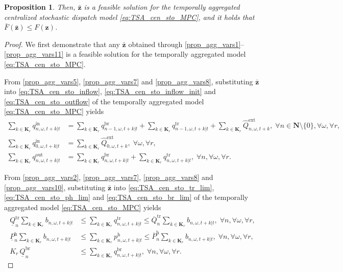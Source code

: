 \documentclass[10pt,a4paper]{amsart}
\newtheorem{proposition}{Proposition}
\begin{document}
\begin{proposition}
Then, $\boldsymbol{\bar{z}}$ is a feasible solution for the temporally aggregated centralized stochastic dispatch model
\eqref{eq:TSA_cen_sto_MPC}, and it holds that $\bar{F}\left(\boldsymbol{\bar{z}}\right) \leq F\left(\boldsymbol{z}\right)$.
\end{proposition}

\begin{proof}
We first demonstrate that any $\boldsymbol{\bar{z}}$ obtained through \eqref{prop_agg_vars1}--\eqref{prop_agg_vars11} is a feasible solution for the temporally aggregated model \eqref{eq:TSA_cen_sto_MPC}.

From \eqref{prop_agg_vars5}, \eqref{prop_agg_vars7} and \eqref{prop_agg_vars8},
substituting $\boldsymbol{\bar{z}}$ into
\eqref{eq:TSA_cen_sto_inflow}, \eqref{eq:TSA_cen_sto_inflow_init} and \eqref{eq:TSA_cen_sto_outflow}
of the temporally aggregated model \eqref{eq:TSA_cen_sto_MPC} yields
\begin{align}
\sum_{k \in \boldsymbol{K}_r} q^{\mathrm{in}}_{n,\omega,t+k|t} & =
\sum_{k \in \boldsymbol{K}_r} q^{\mathrm{br}}_{n-1,\omega,t+k|t}
+
\sum_{k \in \boldsymbol{K}_r} q^{\mathrm{tr}}_{n-1,\omega,t+k|t}
+ \sum_{k \in \boldsymbol{K}_r} \hat{Q}^\mathrm{ext}_{n, \omega, t+k},
\; \forall n \in \boldsymbol{N} \setminus \{0\}, \forall \omega, \forall r,
\label{prop:TSA_cen_sto_inflow}\\
\sum_{k \in \boldsymbol{K}_r} q^{\mathrm{in}}_{0,\omega,t+k|t} & =
\sum_{k \in \boldsymbol{K}_r} \hat{Q}^\mathrm{ext}_{0, \omega, t+k},
\; \forall \omega, \forall r,
\label{prop:TSA_cen_sto_inflow_init}\\
\sum_{k \in \boldsymbol{K}_r} q^{\mathrm{out}}_{n,\omega,t+k|t} & =
\sum_{k \in \boldsymbol{K}_r} q^{\mathrm{br}}_{n,\omega,t+k|t}
+
\sum_{k \in \boldsymbol{K}_r} q^{\mathrm{tr}}_{n,\omega,t+k|t},
\; \forall n, \forall \omega, \forall r.
\label{prop:TSA_cen_sto_outflow}
\end{align}

From \eqref{prop_agg_vars2}, \eqref{prop_agg_vars7}, \eqref{prop_agg_vars8} and \eqref{prop_agg_vars10},
substituting $\boldsymbol{\bar{z}}$ into
\eqref{eq:TSA_cen_sto_tr_lim}, \eqref{eq:TSA_cen_sto_ph_lim} and \eqref{eq:TSA_cen_sto_br_lim}
of the temporally aggregated model \eqref{eq:TSA_cen_sto_MPC} yields
\begin{align}
\underline{Q}^{\mathrm{tr}}_{n}
\sum_{k \in \boldsymbol{K}_r} b_{n,\omega,t+k|t}
& \leq
\sum_{k \in \boldsymbol{K}_r} q^{\mathrm{tr}}_{n,\omega,t+k|t}
\leq
\overline{Q}^{\mathrm{tr}}_{n}
\sum_{k \in \boldsymbol{K}_r} b_{n,\omega,t+k|t},
\; \forall n, \forall \omega, \forall r,
\label{prop:TSA_cen_sto_tr_lim}\\
\underline{P}^{\mathrm{h}}_{n}
\sum_{k \in \boldsymbol{K}_r} b_{n,\omega,t+k|t}
& \leq
\sum_{k \in \boldsymbol{K}_r} p^{\mathrm{h}}_{n,\omega,t+k|t}
\leq
\overline{P}^{\mathrm{h}}_{n}
\sum_{k \in \boldsymbol{K}_r} b_{n,\omega,t+k|t},
\; \forall n, \forall \omega, \forall r,
\label{prop:TSA_cen_sto_ph_lim}\\
K_r \, \underline{Q}^{\mathrm{br}}_{n} & \leq
\sum_{k \in \boldsymbol{K}_r}
q^{\mathrm{br}}_{n, \omega, t+k | t},
\; \forall n, \forall \omega, \forall r.
\label{prop:TSA_cen_sto_br_lim}
\end{align}


\end{proof}
\end{document}
